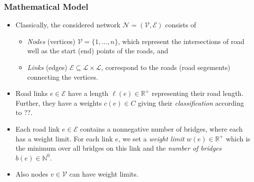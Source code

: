 \documentclass{beamer}   %
\newcommand{\RNum}[1]{\uppercase\expandafter{\romannumeral #1\relax}}
\theoremstyle{break}
\begin{document}
  \begin{frame}
    \frametitle{Mathematical Model \RNum{1}}
    \begin{itemize}

      \item Classically,  the considered network $\mathcal{N}=(\mathcal{V},\mathcal{E})$ consists of
      \begin{itemize}
        \item \emph{Nodes} (vertices) $\mathcal{V}=\{1,\ldots, n\}$, which represent the intersections of road
        well as the start (end) points of the roads, and

        \item \emph{Links} (edges) $\mathcal{E} \subseteq \mathcal{L} \times \mathcal{L}$,
        correspond to the roads (road segements) connecting the vertices.
      \end{itemize}

      \item  Road links $e \in \mathcal{E}$ have a length $\ell(e)\in \mathbb{R}^{+}$ representing their road length.
      Further, they have a weights $c(e) \in C$ giving their \emph{classification} according to {\color{red} ??}.

      \item
      Each road link $e \in \mathcal{E}$ contains a nonnegative number of bridges, where each has a weight limit.
      For each link $e$, we set a \emph{weight limit} $w(e) \in \mathbb{R}^{+}$ which is the
      minimum over all bridges on this link and the \emph{number of bridges} $b(e) \in \mathbb{N}^{0}$.

      \item Also  nodes $v \in \mathcal{V}$ can have weight limits.
    \end{itemize}

  \end{frame}
\end{document}
